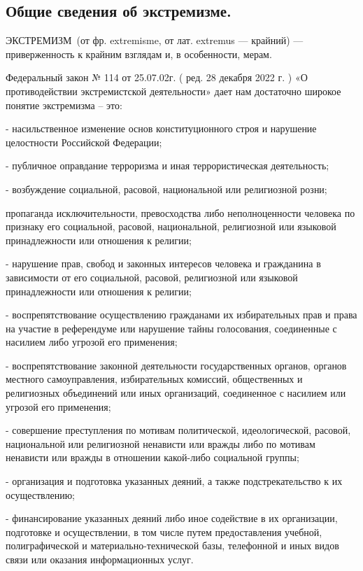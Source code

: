\documentclass[a4paper, 12pt]{article}
\theoremstyle{definition}
\begin{document}
        \subsection{Общие сведения об экстремизме.}

        ЭКСТРЕМИЗМ (от фр. extremisme, от лат. extremus — крайний) — приверженность к крайним взглядам и, в особенности, мерам.

        Федеральный закон № 114 от 25.07.02г. ( ред. 28 декабря 2022 г. ) «О противодействии экстремистской деятельности» дает нам достаточно широкое понятие экстремизма – это:

        - насильственное изменение основ конституционного строя и нарушение целостности Российской Федерации;

        - публичное оправдание терроризма и иная террористическая деятельность;

        - возбуждение социальной, расовой, национальной или религиозной розни;

        пропаганда исключительности, превосходства либо неполноценности человека по признаку его социальной, расовой, национальной, религиозной или языковой принадлежности или отношения к религии;

        - нарушение прав, свобод и законных интересов человека и гражданина в зависимости от его социальной, расовой, религиозной или языковой принадлежности или отношения к религии;

        - воспрепятствование осуществлению гражданами их избирательных прав и права на участие в референдуме или нарушение тайны голосования, соединенные с насилием либо угрозой его применения;

       -  воспрепятствование законной деятельности государственных органов, органов местного самоуправления, избирательных комиссий, общественных и религиозных объединений или иных организаций, соединенное с насилием или угрозой его применения;

        - совершение преступления по мотивам политической, идеологической, расовой, национальной или религиозной ненависти или вражды либо по мотивам ненависти или вражды в отношении какой-либо социальной группы;

        - организация и подготовка указанных деяний, а также подстрекательство к их осуществлению;

        - финансирование указанных деяний   либо иное содействие     в их       организации, подготовке и осуществлении,                  в том числе путем предоставления учебной,       полиграфической и материально-технической базы,      телефонной и иных видов связи или оказания информационных услуг.
\end{document}
